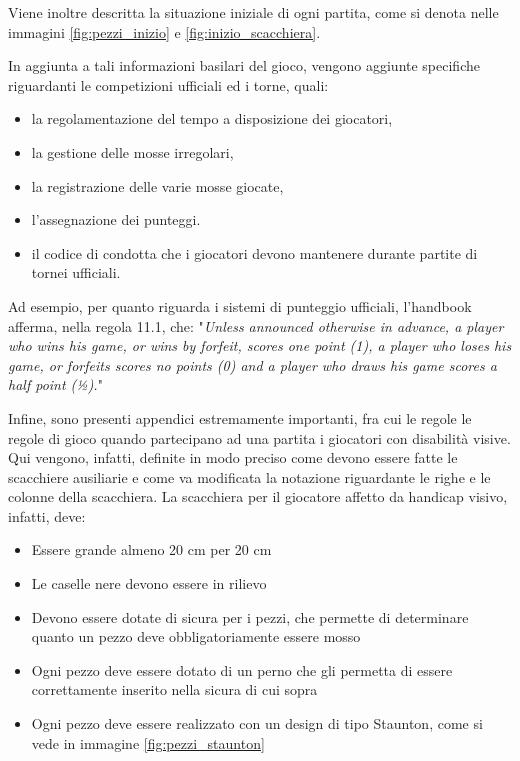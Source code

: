 \documentclass[12pt]{book}
\begin{document}
Viene inoltre descritta la situazione iniziale di ogni partita, come
si denota nelle immagini \ref{fig:pezzi_inizio} e \ref{fig:inizio_scacchiera}.

In aggiunta a tali informazioni basilari del gioco, vengono aggiunte
specifiche riguardanti le competizioni ufficiali ed i torne, quali:

\begin{itemize}
  \item la regolamentazione del tempo a disposizione dei
    giocatori, 
  \item la gestione delle mosse irregolari, 
  \item la registrazione delle varie mosse giocate, 
  \item l'assegnazione dei punteggi.
  \item il codice di condotta che i giocatori devono mantenere durante
    partite di tornei ufficiali.

\end{itemize}

Ad esempio, per quanto riguarda i sistemi di punteggio ufficiali,
l'handbook afferma, nella regola 11.1, che: "\textit{Unless announced otherwise in advance, a player who wins his game, or wins by forfeit,
scores one point (1), a player who loses his game, or forfeits scores no points (0) and a
player who draws his game scores a half point (½).}"

Infine, sono presenti appendici estremamente importanti, fra cui le
regole le regole di gioco quando partecipano ad una partita i giocatori con 
disabilità visive. Qui vengono,
infatti, definite in modo preciso come devono essere fatte le
scacchiere ausiliarie e come va modificata la notazione riguardante le
righe e le colonne della scacchiera. La scacchiera per il giocatore
affetto da handicap visivo, infatti, deve:

\begin{itemize}
  \item Essere grande almeno 20 cm per 20 cm
  \item Le caselle nere devono essere in rilievo
  \item Devono essere dotate di sicura per i pezzi, che permette di
    determinare quanto un pezzo deve obbligatoriamente essere mosso
  \item Ogni pezzo deve essere dotato di un perno che gli permetta di
    essere correttamente inserito nella sicura di cui sopra
  \item Ogni pezzo deve essere realizzato con un design di tipo
    Staunton, come si vede in immagine \ref{fig:pezzi_staunton}
\end{itemize}
\end{document}
